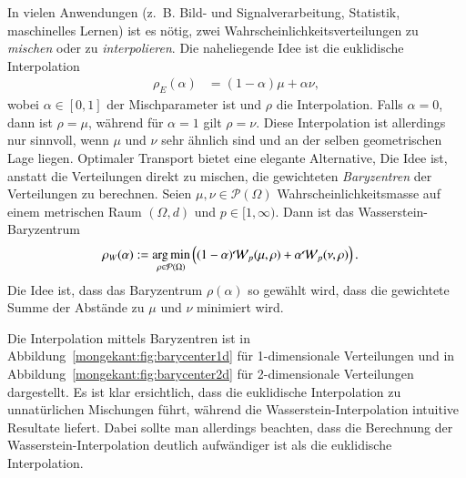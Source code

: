 In vielen Anwendungen
(z.~B. Bild- und Signalverarbeitung, Statistik, maschinelles Lernen) ist es nötig,
zwei Wahrscheinlichkeitsverteilungen zu \emph{mischen}
oder zu \emph{interpolieren}.
Die naheliegende Idee ist die euklidische Interpolation
%
%
\begin{align}
\rho_E(\alpha)
&=
(1-\alpha) \mu + \alpha \nu
\label{mongekant:eq:euclidean_barycenter}
,
\end{align}
wobei $\alpha \in [0,1]$ der Mischparameter ist und $\rho$ die Interpolation.
Falls $\alpha=0$,
dann ist $\rho=\mu$,
während für $\alpha=1$ gilt $\rho=\nu$.
Diese Interpolation ist allerdings nur sinnvoll,
wenn $\mu$ und $\nu$ sehr ähnlich sind und an der selben geometrischen Lage liegen.
Optimaler Transport bietet eine elegante Alternative,
Die Idee ist,
anstatt die Verteilungen direkt zu mischen,
die gewichteten \emph{Baryzentren} der Verteilungen zu berechnen.
%
Seien $\mu, \nu \in \mathcal{P}(\Omega)$ Wahrscheinlichkeitsmasse
auf einem metrischen Raum $(\Omega, d)$
und $p \in [1, \infty)$.
Dann ist das Wasserstein-Baryzentrum
\begin{align}
\rho_W(\alpha)
&:=
\underset{\rho \in \mathcal{P}(\Omega)}{\mathrm{arg\,min}}\left(
(1-\alpha) \wasserstein(\mu, \rho)
+ \alpha \wasserstein(\nu, \rho)
\right)
\label{mongekant:eq:wasserstein_barycenter}
.
\end{align}
Die Idee ist,
dass das Baryzentrum $\rho(\alpha)$
so gewählt wird,
dass die gewichtete Summe der Abstände zu $\mu$ und $\nu$ minimiert wird.

Die Interpolation mittels Baryzentren
ist in Abbildung~\ref{mongekant:fig:barycenter1d} für 1-dimensionale Verteilungen
und in Abbildung~\ref{mongekant:fig:barycenter2d} für 2-dimensionale Verteilungen
dargestellt.
Es ist klar ersichtlich,
dass die euklidische Interpolation
zu unnatürlichen Mischungen führt,
während die Wasserstein-Interpolation
%
%
intuitive Resultate liefert.
Dabei sollte man allerdings beachten,
dass die Berechnung der Wasserstein-Interpolation
deutlich aufwändiger ist als die euklidische Interpolation.

